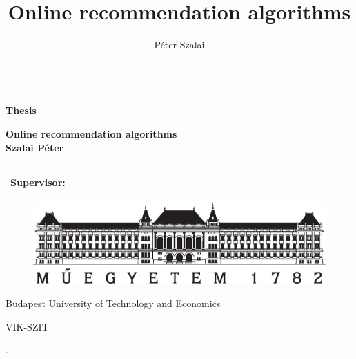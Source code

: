 \documentclass[a4paper,11pt,oneside,usenames,dvipsnames]{report}
\title{Online recommendation algorithms}
\author{P\'eter Szalai}
\begin{document}

\thispagestyle{empty}
\begin{center}

{ $\left. \right.$ \\ \vspace{0.5cm} \large \textbf{Thesis} \\ }
\vspace{2cm}

{ \large \textbf{Online recommendation algorithms} \\
\vspace{1cm}  
\textbf{Szalai P\'eter} \\ }
\vspace{2cm}

\begin{tabular}{c}

\end{tabular}

\begin{tabular}{l l l }
 {\bf Supervisor:}
\end{tabular}

\vspace*{2cm}


\begin{figure}[h]
\centering
\includegraphics[scale=.4]{tex/pic/bme_logo.eps}
\end{figure}
\vspace*{-.25cm}
\begin{center}
{\normalsize \rmfamily Budapest University of Technology and Economics}
\end{center}
\vspace*{-.5cm}
\begin{center}
{\normalsize \rmfamily VIK-SZIT}
\end{center}

\begin{center}
{\normalsize {}.}
\end{center} 

\end{center}
\newpage

\tableofcontents
{}

\setcounter{page}{1}






\newpage
\begin{thebibliography}{9}

\end{thebibliography}
\end{document}
